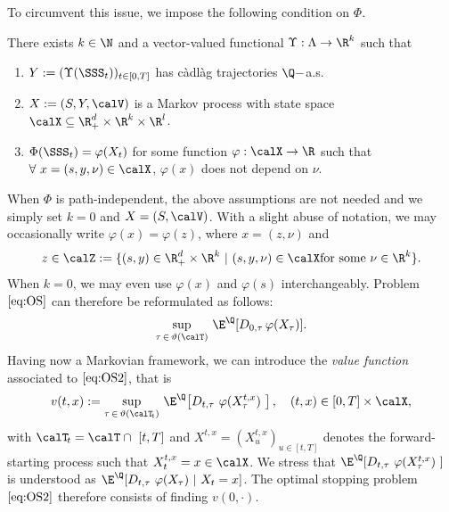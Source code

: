 To circumvent this issue, we impose the following condition on $\Phi$. 
\begin{asm}\label{asm:enlargement}
There exists $k\in \N$ and a vector-valued functional $\Upsilon: \Lambda \to \R^k$ such that
\begin{enumerate}
\item $Y := (\Upsilon(\SSS_t))_{t\in [0,T]}$ has c\`adl\`ag trajectories $\Q-$a.s. 
    \item $X := (S,Y,\calV)$ is a Markov process with state space $\calX \subseteq  \R^d_+ \times \R^{k} \times \R^{l}$.
    \item  $\Phi(\SSS_t) = \varphi(X_t)$ for some function $\varphi:\calX \to \R$ such that  $ \forall \ x=(s,y,\nu) \in \calX$,  $\varphi(x)$ does not depend on $\nu$.
\end{enumerate}
\end{asm}

When $\Phi$ is path-independent, the above assumptions are not needed and we simply set $k=0$ and $X=(S,\calV)$. With a slight abuse of notation, we may occasionally write $\varphi(x)=\varphi(z)$, where $x=(z,\nu)$ and  
\begin{equation} \label{eq:Z}
    z\in \calZ := \{(s,y) \in \R_+^d \times \R^k \ | \ (s,y,\nu) \in \calX \text{for some } \nu \in \R^k\}.
\end{equation} 
When $k=0$, we  may even use $\varphi(x)$ and $\varphi(s)$ interchangeably.  %
Problem $\eqref{eq:OS}$ can therefore be reformulated as follows:
\begin{equation}\label{eq:OS2}
\underset{\tau \, \in \, \vartheta(\calT)}{\text{sup}} \ \E^{\Q}[D_{0,\tau}\, \varphi(X_{\tau})].
\end{equation} 
Having now a Markovian framework, we can introduce the \textit{value function} associated to $\eqref{eq:OS2}$, that is
\begin{equation} \label{eq:valueFct}
v(t,x):= \underset{\tau \, \in\,  \vartheta(\calT_{\!t})}{\text{sup}} \
\E^{\Q}\! \left[ D_{t,\tau}\ \varphi(X^{t,x}_\tau)\ \right],\quad (t,x)\in [0,T]\times \calX,
\end{equation} %
with $\calT_{\!t} = \calT \cap \ [t,T]$ and $X^{t,x} = (X_u^{t,x})_{u\in [t,T]}$ denotes the forward-starting process such that $X^{t,x}_t= x \in \calX$.  We stress that  $\E^{\Q}\! \left[ D_{t,\tau}\ \varphi(X^{t,x}_\tau)\ \right]$ is understood as $\E^{\Q}\! \left[ D_{t,\tau}\ \varphi(X_\tau)\ | \ X_t= x\right]$.  %
The optimal stopping problem  $\eqref{eq:OS2}$ therefore consists of finding $v(0,\cdot)$.

